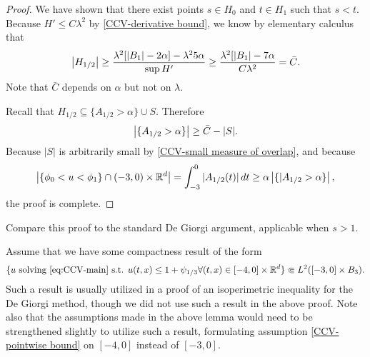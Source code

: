 \begin{proof}
We have shown that there exist points $s \in H_0$ and $t \in H_1$ such that $s < t$.  Because $H' \leq C \lambda^2$ by \eqref{CCV-derivative bound}, we know by elementary calculus that
\[ \left\lvert H_{1/2} \right\rvert \geq \frac{\lambda^2[|B_1|-2\alpha] - \lambda^2 5 \alpha }{\sup H'} \geq \frac{\lambda^2[|B_1| - 7\alpha }{C \lambda^2} = \bar{C}. \]
Note that $\bar{C}$ depends on $\alpha$ but not on $\lambda$.  

Recall that $H_{1/2} \subseteq \{A_{1/2} > \alpha \} \cup S$.  Therefore
\[ \left\lvert \{A_{1/2} > \alpha\} \right\rvert \geq \bar{C} - |S|. \]
Because $|S|$ is arbitrarily small by \eqref{CCV-small measure of overlap}, and because
\[ \left\lvert \{\phi_0 < u < \phi_1\} \cap (-3,0)\times \mathbb{R}^d \right\rvert = \int_{-3}^0 |A_{1/2}(t)| \,dt \geq \alpha \left\lvert \{|A_{1/2} > \alpha \} \right\rvert, \]
the proof is complete.  

\end{proof}








%
%

Compare this proof to the standard De Giorgi argument, applicable when $s > 1$.  

Assume that we have some compactness result of the form 
\[ \{u \textrm{ solving } \eqref{eq:CCV-main} \textrm{ s.t. } u(t,x) \leq 1 + \psi_{1/3} \forall (t,x) \in [-4,0]\times\mathbb{R}^d \} \Subset L^2([-3,0]\times B_3). \]
Such a result is usually utilized in a proof of an isoperimetric inequality for the De Giorgi method, though we did not use such a result in the above proof.  Note also that the assumptions made in the above lemma would need to be strengthened slightly to utilize such a result, formulating assumption \eqref{CCV-pointwise bound} on $[-4,0]$ instead of $[-3,0]$.  

